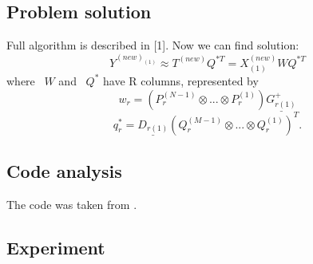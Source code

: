 \documentclass[../../main.tex]{subfiles}
\begin{document}
\subsection{Problem solution}
Full algorithm is described in [1]. Now we can find solution:
$${Y}^{(new)_{(1)}} \approx T^{(new)}Q^{*T} = X^{(new)}_{(1)}WQ^{*T}$$
where ~$W$ and ~$Q^*$ have R columns, represented by 
$$w_r = (P_r^{(N-1)}\otimes ...\otimes P_r^{(1)})\underline{G_{r(1)}^+}$$
$$q_r^* = \underline{D_{r(1)}}(Q_r^{(M-1)}\otimes ...\otimes Q_r^{(1)})^T.$$

\subsection{Code analysis}

The code was taken from \cite{zhao2012higher}.

\subsection{Experiment}
\end{document}
